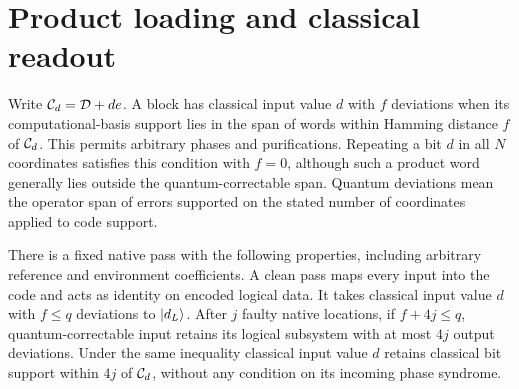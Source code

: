 \section{Product loading and classical readout}\label{sec:boundary}
Write $\mathcal C_d=\mathcal D+de$. A block has classical input value $d$ with $f$ deviations when its computational-basis support lies in the span of words within Hamming distance $f$ of $\mathcal C_d$. This permits arbitrary phases and purifications. Repeating a bit $d$ in all $N$ coordinates satisfies this condition with $f=0$, although such a product word generally lies outside the quantum-correctable span. Quantum deviations mean the operator span of errors supported on the stated number of coordinates applied to code support.

\begin{lemma}\label{lem:teleport}
There is a fixed native pass with the following properties, including arbitrary reference and environment coefficients. A clean pass maps every input into the code and acts as identity on encoded logical data. It takes classical input value $d$ with $f\le q$ deviations to $\lvert d_L\rangle$. After $j$ faulty native locations, if $f+4j\le q$, quantum-correctable input retains its logical subsystem with at most $4j$ output deviations. Under the same inequality classical input value $d$ retains classical bit support within $4j$ of $\mathcal C_d$, without any condition on its incoming phase syndrome.
\end{lemma}
